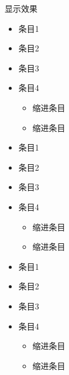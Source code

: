 \documentclass[letterpaper,10pt,english]{sphinxmanual}
\begin{document}
\sphinxAtStartPar
显示效果
\begin{itemize}
\item {} 
\sphinxAtStartPar
条目1

\item {} 
\sphinxAtStartPar
条目2

\item {} 
\sphinxAtStartPar
条目3

\item {} 
\sphinxAtStartPar
条目4
\begin{itemize}
\item {} 
\sphinxAtStartPar
缩进条目

\item {} 
\sphinxAtStartPar
缩进条目

\end{itemize}

\end{itemize}
\begin{itemize}
\item {} 
\sphinxAtStartPar
条目1

\item {} 
\sphinxAtStartPar
条目2

\item {} 
\sphinxAtStartPar
条目3

\item {} 
\sphinxAtStartPar
条目4
\begin{itemize}
\item {} 
\sphinxAtStartPar
缩进条目

\item {} 
\sphinxAtStartPar
缩进条目

\end{itemize}

\end{itemize}
\begin{itemize}
\item {} 
\sphinxAtStartPar
条目1

\item {} 
\sphinxAtStartPar
条目2

\item {} 
\sphinxAtStartPar
条目3

\item {} 
\sphinxAtStartPar
条目4
\begin{itemize}
\item {} 
\sphinxAtStartPar
缩进条目

\item {} 
\sphinxAtStartPar
缩进条目

\end{itemize}

\end{itemize}
\end{document}

